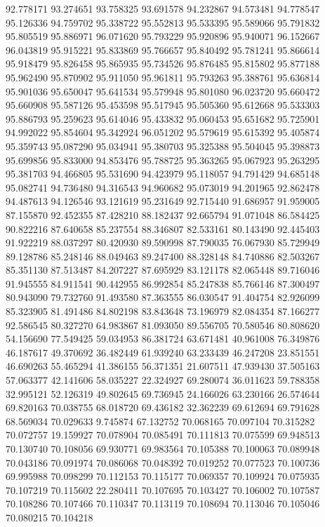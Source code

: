 92.778171
93.274651
93.758325
93.691578
94.232867
94.573481
94.778547
95.126336
94.759702
95.338722
95.552813
95.533395
95.589066
95.791832
95.805519
95.886971
96.071620
95.793229
95.920896
95.940071
96.152667
96.043819
95.915221
95.833869
95.766657
95.840492
95.781241
95.866614
95.918479
95.826458
95.865935
95.734526
95.876485
95.815802
95.877188
95.962490
95.870902
95.911050
95.961811
95.793263
95.388761
95.636814
95.901036
95.650047
95.641534
95.579948
95.801080
96.023720
95.660472
95.660908
95.587126
95.453598
95.517945
95.505360
95.612668
95.533303
95.886793
95.259623
95.614046
95.433832
95.060453
95.651682
95.725901
94.992022
95.854604
95.342924
96.051202
95.579619
95.615392
95.405874
95.359743
95.087290
95.034941
95.380703
95.325388
95.504045
95.398873
95.699856
95.833000
94.853476
95.788725
95.363265
95.067923
95.263295
95.381703
94.466805
95.531690
94.423979
95.118057
94.791429
94.685148
95.082741
94.736480
94.316543
94.960682
95.073019
94.201965
92.862478
94.487613
94.126546
93.121619
95.231649
92.715440
91.686957
91.959005
87.155870
92.452355
87.428210
88.182437
92.665794
91.071048
86.584425
90.822216
87.640658
85.237554
88.346807
82.533161
80.143490
92.445403
91.922219
88.037297
80.420930
89.590998
87.790035
76.067930
85.729949
89.128786
85.248146
88.049463
89.247400
88.328148
84.740886
82.503267
85.351130
87.513487
84.207227
87.695929
83.121178
82.065448
89.716046
91.945555
84.911541
90.442955
86.992854
85.247838
85.766146
87.300497
80.943090
79.732760
91.493580
87.363555
86.030547
91.404754
82.926099
85.323905
81.491486
84.802198
83.843648
73.196979
82.084354
87.166277
92.586545
80.327270
64.983867
81.093050
89.556705
70.580546
80.808620
54.156690
77.549425
59.034953
86.381724
63.671481
40.961008
76.349876
46.187617
49.370692
36.482449
61.939240
63.233439
46.247208
23.851551
46.690263
55.465294
41.386155
56.371351
21.607511
47.939430
37.505163
57.063377
42.141606
58.035227
22.324927
69.280074
36.011623
59.788358
32.995121
52.126319
49.802645
69.736945
24.166026
63.230166
26.574644
69.820163
70.038755
68.018720
69.436182
32.362239
69.612694
69.791628
68.569034
70.029633
9.745874
67.132752
70.068165
70.097104
70.315282
70.072757
19.159927
70.078904
70.085491
70.111813
70.075599
69.948513
70.130740
70.108056
69.930771
69.983564
70.105388
70.100063
70.089948
70.043186
70.091974
70.086068
70.048392
70.019252
70.077523
70.100736
69.995988
70.098299
70.112153
70.115177
70.069357
70.109924
70.075935
70.107219
70.115602
22.280411
70.107695
70.103427
70.106002
70.107587
70.108286
70.107466
70.110347
70.113119
70.108694
70.113046
70.105046
70.080215
70.104218
